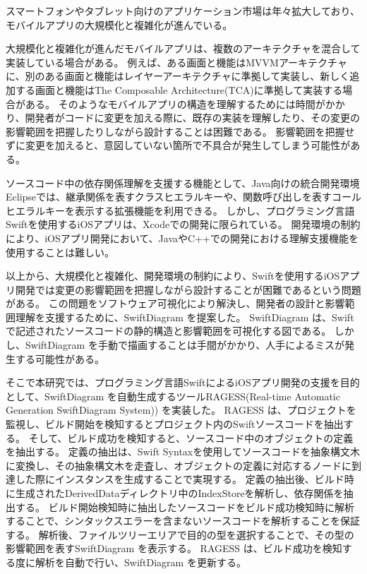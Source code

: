 \documentclass[uplatex]{jsarticle}
\begin{document}

\AbstractHeader

\begin{AbstractBody}
スマートフォンやタブレット向けのアプリケーション市場は年々拡大しており、モバイルアプリの大規模化と複雑化が進んでいる。

大規模化と複雑化が進んだモバイルアプリは、複数のアーキテクチャを混合して実装している場合がある。
例えば、ある画面と機能はMVVMアーキテクチャに、別のある画面と機能はレイヤーアーキテクチャに準拠して実装し、新しく追加する画面と機能はThe Composable Architecture(TCA)に準拠して実装する場合がある。
そのようなモバイルアプリの構造を理解するためには時間がかかり、開発者がコードに変更を加える際に、既存の実装を理解したり、その変更の影響範囲を把握したりしながら設計することは困難である。
影響範囲を把握せずに変更を加えると、意図していない箇所で不具合が発生してしまう可能性がある。

ソースコード中の依存関係理解を支援する機能として、Java向けの統合開発環境Eclipseでは、継承関係を表すクラスヒエラルキーや、関数呼び出しを表すコールヒエラルキーを表示する拡張機能を利用できる。
しかし、プログラミング言語Swiftを使用するiOSアプリは、Xcodeでの開発に限られている。
開発環境の制約により、iOSアプリ開発において、JavaやC++での開発における理解支援機能を使用することは難しい。

以上から、大規模化と複雑化、開発環境の制約により、Swiftを使用するiOSアプリ開発では変更の影響範囲を把握しながら設計することが困難であるという問題がある。
この問題をソフトウェア可視化により解決し、開発者の設計と影響範囲理解を支援するために、SwiftDiagram を提案した。
SwiftDiagram は、Swiftで記述されたソースコードの静的構造と影響範囲を可視化する図である。
しかし、SwiftDiagram を手動で描画することは手間がかかり、人手によるミスが発生する可能性がある。

そこで本研究では、プログラミング言語SwiftによるiOSアプリ開発の支援を目的として、SwiftDiagram を自動生成するツールRAGESS(Real-time Automatic Generation SwiftDiagram System)) を実装した。
RAGESS は、プロジェクトを監視し、ビルド開始を検知するとプロジェクト内のSwiftソースコードを抽出する。
そして、ビルド成功を検知すると、ソースコード中のオブジェクトの定義を抽出する。
定義の抽出は、Swift Syntaxを使用してソースコードを抽象構文木に変換し、その抽象構文木を走査し、オブジェクトの定義に対応するノードに到達した際にインスタンスを生成することで実現する。
定義の抽出後、ビルド時に生成されたDerivedDataディレクトリ中のIndexStoreを解析し、依存関係を抽出する。
ビルド開始検知時に抽出したソースコードをビルド成功検知時に解析することで、シンタックスエラーを含まないソースコードを解析することを保証する。
解析後、ファイルツリーエリアで目的の型を選択することで、その型の影響範囲を表すSwiftDiagram を表示する。
RAGESS は、ビルド成功を検知する度に解析を自動で行い、SwiftDiagram を更新する。


\end{AbstractBody}
\end{document}
